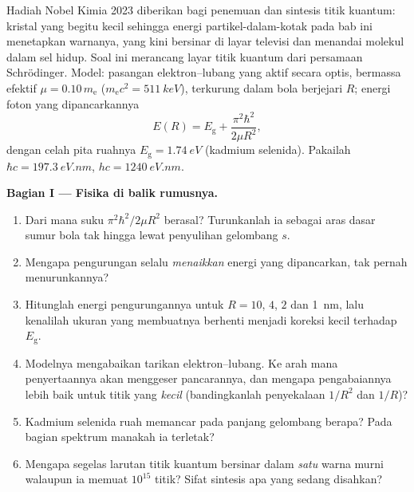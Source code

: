 \begin{problem}\label{pb:b3:schrodinger-three-dimensions:1}
Hadiah Nobel Kimia 2023 diberikan bagi penemuan dan sintesis titik
kuantum: kristal yang begitu kecil sehingga energi partikel-dalam-kotak
pada bab ini menetapkan warnanya, yang kini bersinar di layar televisi
dan menandai molekul dalam sel hidup. Soal ini merancang layar titik
kuantum dari persamaan Schrödinger. Model: pasangan elektron--lubang
yang aktif secara optis, bermassa efektif $\mu = 0.10\,m_{\text{e}}$
($m_{\text{e}}c^2 = \qty{511}{keV}$), terkurung dalam bola berjejari
$R$; energi foton yang dipancarkannya
\[
E(R) = E_{\text{g}} + \frac{\pi^2\hbar^2}{2\mu R^2} ,
\]
dengan celah pita ruahnya $E_{\text{g}} = \qty{1.74}{eV}$ (kadmium
selenida). Pakailah $\hbar c = \qty{197.3}{eV.nm}$, $hc =
\qty{1240}{eV.nm}$.

\medskip\noindent\textbf{Bagian I --- Fisika di balik rumusnya.}
\begin{enumerate}
  \item Dari mana suku $\pi^2\hbar^2/2\mu R^2$ berasal? Turunkanlah ia
        sebagai aras dasar sumur bola tak hingga lewat penyulihan
        gelombang $s$.
  \item Mengapa pengurungan selalu \emph{menaikkan} energi yang
        dipancarkan, tak pernah menurunkannya?
  \item Hitunglah energi pengurungannya untuk $R = 10$, $4$, $2$ dan
        \qty{1}{nm}, lalu kenalilah ukuran yang membuatnya berhenti
        menjadi koreksi kecil terhadap $E_{\text{g}}$.
  \item Modelnya mengabaikan tarikan elektron--lubang. Ke arah mana
        penyertaannya akan menggeser pancarannya, dan mengapa
        pengabaiannya lebih baik untuk titik yang \emph{kecil}
        (bandingkanlah penyekalaan $1/R^2$ dan $1/R$)?
  \item Kadmium selenida ruah memancar pada panjang gelombang berapa?
        Pada bagian spektrum manakah ia terletak?
  \item Mengapa segelas larutan titik kuantum bersinar dalam
        \emph{satu} warna murni walaupun ia memuat $10^{15}$ titik?
        Sifat sintesis apa yang sedang disahkan?
\end{enumerate}


\end{problem}

